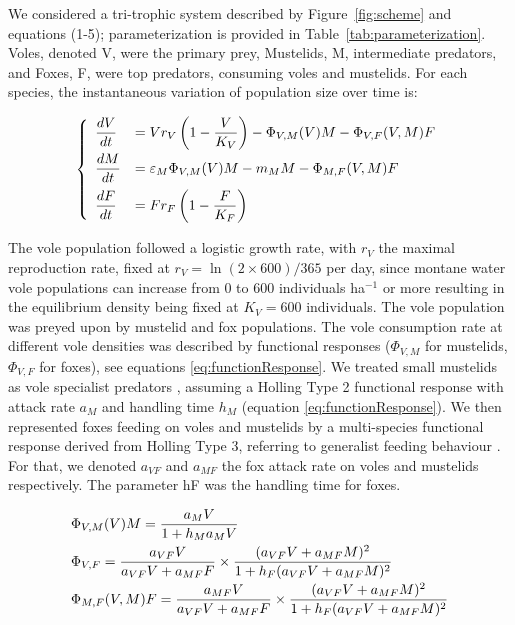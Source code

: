 \documentclass[11pt]{article}
\begin{document}
We considered a tri-trophic system described by Figure~\ref{fig:scheme} and equations (1-5); parameterization is provided in Table~\ref{tab:parameterization}. Voles, denoted V, were the primary prey, Mustelids, M, intermediate predators, and Foxes, F, were top predators, consuming voles and mustelids. For each species, the instantaneous variation of population size over time is:

\begin{equation}
\left\{
\begin{array}{l l}
\dfrac{dV}{dt} & = V r_V \left( 1- \dfrac{V}{K_V}\right) - \Phi_{V,M}(V)M - \Phi_{V,F}(V,M)F\\[.3cm]
%
\dfrac{dM}{dt} & = \varepsilon_M \Phi_{V,M}(V)M - m_M M - \Phi_{M,F}(V,M)F\\[.3cm]
%
\dfrac{dF}{dt} & = F r_F \left( 1- \dfrac{F}{K_F}\right)
\end{array}
\right.
\end{equation}

The vole population followed a logistic growth rate, with $r_V$  the maximal reproduction rate, fixed at $r_V = \ln(2 \times 600)/365$ per day, since montane water vole populations can increase from 0  to  600 individuals ha$^{-1}$ or more \citep{Giraudoux1997} resulting in the equilibrium density being fixed at $K_V = 600$ individuals. 
%
The vole population was preyed upon by mustelid and fox populations. The vole consumption rate at different vole densities was described by functional responses ($\Phi_{V,M}$ for mustelids, $\Phi_{V,F}$  for foxes), see equations \eqref{eq:functionResponse}.
%
We treated small mustelids as vole specialist predators \citep{King2006}, assuming a Holling Type 2 functional response with attack rate $a_M$ and handling time $h_M$ (equation \eqref{eq:functionResponse}). We then represented foxes feeding on voles and mustelids by a multi-species functional response derived from Holling Type 3, referring to generalist feeding behaviour \citep{Baudrot2016}. For that, we denoted $a_{VF}$ and $a_{MF}$ the fox attack rate on voles and mustelids respectively. The parameter hF was the handling time for foxes.


\begin{equation}
\begin{array}{l l}
 \Phi_{V,M}(V)M = \dfrac{a_M V}{1 + h_M a_M V} \\[.3cm]
 \Phi_{V,F} = \dfrac{a_{VF} V}{a_{VF}V + a_{MF}F} \times \dfrac{(a_{VF}V + a_{MF} M)^2}{1 + h_F(a_{VF}V + a_{MF} M)^2}\\[.3cm]
  \Phi_{M,F}(V,M)F = \dfrac{a_{MF}V}{a_{VF}V + a_{MF}F} \times \dfrac{(a_{VF}V + a_{MF}M)^2}{1+h_F(a_{VF}V + a_{MF}M)^2}
\end{array}
\label{eq:functionResponse}
\end{equation}
\end{document}
